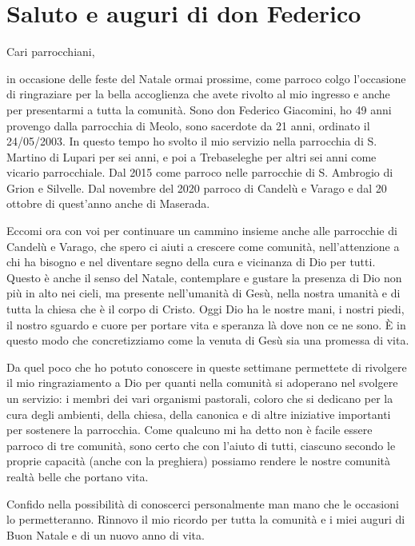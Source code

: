 \section{Saluto e auguri di don Federico}

Cari parrocchiani,

in occasione delle feste del Natale ormai prossime, come parroco colgo l'occasione di ringraziare per la bella accoglienza che avete rivolto al mio ingresso e anche per presentarmi a tutta la comunità. Sono don Federico Giacomini, ho 49 anni provengo dalla parrocchia di Meolo, sono sacerdote da 21 anni, ordinato il 24/05/2003. In questo tempo ho svolto il mio servizio nella parrocchia di S. Martino di Lupari per sei anni, e poi a Trebaseleghe per altri sei anni come vicario parrocchiale. Dal 2015 come parroco nelle parrocchie di S. Ambrogio di Grion e Silvelle. Dal novembre del 2020 parroco di Candelù e Varago e dal 20 ottobre di quest'anno anche di Maserada.

Eccomi ora con voi per continuare un cammino insieme anche alle parrocchie di Candelù e Varago, che spero ci aiuti a crescere come comunità, nell'attenzione a chi ha bisogno e nel diventare segno della cura e vicinanza di Dio per tutti. Questo è anche il senso del Natale, contemplare e gustare la presenza di Dio non più in alto nei cieli, ma presente nell'umanità di Gesù, nella nostra umanità e di tutta la chiesa che è il corpo di Cristo. Oggi Dio ha le nostre mani, i nostri piedi, il nostro sguardo e cuore per portare vita e speranza là dove non ce ne sono. È in questo modo che concretizziamo come la venuta di Gesù sia una promessa di vita.

Da quel poco che ho potuto conoscere in queste settimane permettete di rivolgere il mio ringraziamento a Dio per quanti nella comunità si adoperano nel svolgere un servizio: i membri dei vari organismi pastorali, coloro che si dedicano per la cura degli ambienti, della chiesa, della canonica e di altre iniziative importanti per sostenere la parrocchia. Come qualcuno mi ha detto non è facile essere parroco di tre comunità, sono certo che con l'aiuto di tutti, ciascuno secondo le proprie capacità (anche con la preghiera) possiamo rendere le nostre comunità realtà belle che portano vita.

Confido nella possibilità di conoscerci personalmente man mano che le occasioni lo permetteranno. Rinnovo il mio ricordo per tutta la comunità e i miei auguri di Buon Natale e di un nuovo anno di vita.

